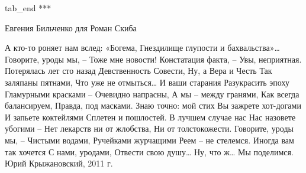   tab_end
\fi
***

Евгения Бильченко для Роман Скиба 

\begin{multicols}{3}
\obeycr
\noindent
А кто-то роняет нам вслед: «Богема,
Гнездилище глупости и бахвальства»…
Говорите, уроды мы, –
Тоже мне новости!
\smallskip
Констатация факта, –
Увы, неприятная.
Потерялась лет сто назад
Девственность Совести,
\smallskip
Ну, а Вера и Честь
Так заляпаны пятнами,
Что уже не отмыться…
\smallskip
И ваши старания
Разукрасить эпоху
Гламурными красками –
Очевидно напрасны,
\smallskip
А мы – между гранями,
Как всегда балансируем,
Правда, под масками.
\smallskip
Знаю точно: мой стих
Вы зажрете хот-догами
И запьете коктейлями
Сплетен и пошлостей.
\smallskip
В лучшем случае нас
Нас назовете убогими –
Нет лекарств ни от жлобства,
Ни от толстокожести.
\smallskip
Говорите, уроды мы, –
Чистыми водами,
Ручейками журчащими
Реем – не стелемся.
\smallskip
Иногда вам так хочется
С нами, уродами,
Отвести свою душу…
Ну, что ж… Мы поделимся.
\smallskip
Юрий Крыжановский, 2011 г.
\restorecr
\end{multicols}
